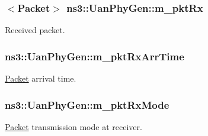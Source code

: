 \subsubsection[{\texorpdfstring{m\+\_\+pkt\+Rx}{m_pktRx}}]{$<${\bf Packet}$>$ ns3\+::\+Uan\+Phy\+Gen\+::m\+\_\+pkt\+Rx\hspace{0.3cm}{\ttfamily [private]}}\hypertarget{classns3_1_1UanPhyGen_a62bb9d948402d5a6bf95b23ca8411b66}{}\label{classns3_1_1UanPhyGen_a62bb9d948402d5a6bf95b23ca8411b66}


Received packet. 

\subsubsection[{\texorpdfstring{m\+\_\+pkt\+Rx\+Arr\+Time}{m_pktRxArrTime}}]{ ns3\+::\+Uan\+Phy\+Gen\+::m\+\_\+pkt\+Rx\+Arr\+Time\hspace{0.3cm}{\ttfamily [private]}}\hypertarget{classns3_1_1UanPhyGen_a33a47b583aae2385b33cf10aec496739}{}\label{classns3_1_1UanPhyGen_a33a47b583aae2385b33cf10aec496739}


\hyperlink{classns3_1_1Packet}{Packet} arrival time. 

\subsubsection[{\texorpdfstring{m\+\_\+pkt\+Rx\+Mode}{m_pktRxMode}}]{ ns3\+::\+Uan\+Phy\+Gen\+::m\+\_\+pkt\+Rx\+Mode\hspace{0.3cm}{\ttfamily [private]}}\hypertarget{classns3_1_1UanPhyGen_abce657fc1ddcb1dd7b3023d13498b3ae}{}\label{classns3_1_1UanPhyGen_abce657fc1ddcb1dd7b3023d13498b3ae}


\hyperlink{classns3_1_1Packet}{Packet} transmission mode at receiver. 

